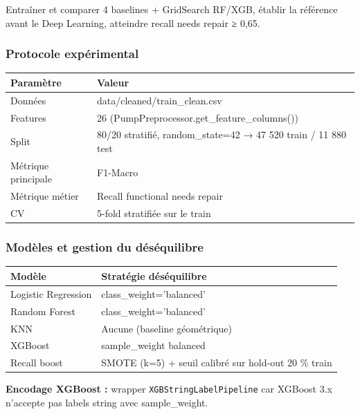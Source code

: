 \documentclass[11pt,a4paper]{report}
\begin{document}
Entraîner et comparer 4 baselines + GridSearch RF/XGB, établir la référence avant le Deep Learning, atteindre recall needs repair ≥ 0,65.



\subsubsection{Protocole expérimental}



\begin{longtable}{@{}ll@{}}
\toprule
Paramètre & Valeur \\
\midrule
Données & data/cleaned/train\_clean.csv \\
Features & 26 (PumpPreprocessor.get\_feature\_columns()) \\
Split & 80/20 stratifié, random\_state=42 → 47 520 train / 11 880 test \\
Métrique principale & F1-Macro \\
Métrique métier & Recall functional needs repair \\
CV & 5-fold stratifiée sur le train \\
\bottomrule
\end{longtable}




\subsubsection{Modèles et gestion du déséquilibre}



\begin{longtable}{@{}ll@{}}
\toprule
Modèle & Stratégie déséquilibre \\
\midrule
Logistic Regression & class\_weight='balanced' \\
Random Forest & class\_weight='balanced' \\
KNN & Aucune (baseline géométrique) \\
XGBoost & sample\_weight balanced \\
Recall boost & SMOTE (k=5) + seuil calibré sur hold-out 20 \% train \\
\bottomrule
\end{longtable}




\textbf{Encodage XGBoost :} wrapper \texttt{XGBStringLabelPipeline} car XGBoost 3.x n'accepte pas labels string avec sample\_weight.
\end{document}
